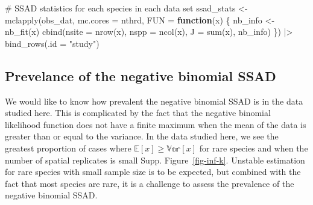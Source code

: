 \documentclass[
  letterpaper,
  DIV=11,
  numbers=noendperiod]{scrartcl}
\newenvironment{Shaded}{\begin{snugshade}}{\end{snugshade}}
\newcommand{\AttributeTok}[1]{\textcolor[rgb]{0.40,0.45,0.13}{#1}}
\newcommand{\CommentTok}[1]{\textcolor[rgb]{0.37,0.37,0.37}{#1}}
\newcommand{\ControlFlowTok}[1]{\textcolor[rgb]{0.00,0.23,0.31}{\textbf{#1}}}
\newcommand{\FunctionTok}[1]{\textcolor[rgb]{0.28,0.35,0.67}{#1}}
\newcommand{\NormalTok}[1]{\textcolor[rgb]{0.00,0.23,0.31}{#1}}
\newcommand{\OtherTok}[1]{\textcolor[rgb]{0.00,0.23,0.31}{#1}}
\newcommand{\SpecialCharTok}[1]{\textcolor[rgb]{0.37,0.37,0.37}{#1}}
\newcommand{\StringTok}[1]{\textcolor[rgb]{0.13,0.47,0.30}{#1}}
\begin{document}
\begin{Shaded}
\begin{Highlighting}[]
\CommentTok{\# SSAD statistics for each species in each data set}
\NormalTok{ssad\_stats }\OtherTok{\textless{}{-}} \FunctionTok{mclapply}\NormalTok{(obs\_dat, }
                       \AttributeTok{mc.cores =}\NormalTok{ nthrd, }
                       \AttributeTok{FUN =} \ControlFlowTok{function}\NormalTok{(x) \{}
\NormalTok{                           nb\_info }\OtherTok{\textless{}{-}} \FunctionTok{nb\_fit}\NormalTok{(x)}
                           \FunctionTok{cbind}\NormalTok{(}\AttributeTok{nsite =} \FunctionTok{nrow}\NormalTok{(x), }\AttributeTok{nspp =} \FunctionTok{ncol}\NormalTok{(x), }
                                 \AttributeTok{J =} \FunctionTok{sum}\NormalTok{(x), nb\_info)}
\NormalTok{                       \}) }\SpecialCharTok{|\textgreater{}} 
    \FunctionTok{bind\_rows}\NormalTok{(}\AttributeTok{.id =} \StringTok{"study"}\NormalTok{)}
\end{Highlighting}
\end{Shaded}

\subsection{Prevelance of the negative binomial
SSAD}\label{prevelance-of-the-negative-binomial-ssad}

We would like to know how prevalent the negative binomial SSAD is in the
data studied here. This is complicated by the fact that the negative
binomial likelihood function does not have a finite maximum when the
mean of the data is greater than or equal to the variance. In the data
studied here, we see the greatest proportion of cases where
\(\mathbb{E}[x] \geq \mathbb{Var}[x]\) for rare species and when the
number of spatial replicates is small Supp. Figure~\ref{fig-inf-k}.
Unstable estimation for rare species with small sample size is to be
expected, but combined with the fact that most species are rare, it is a
challenge to assess the prevalence of the negative binomial SSAD.
\end{document}
